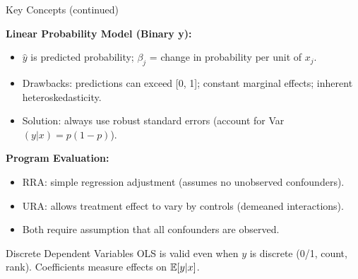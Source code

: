 \documentclass[aspectratio=169, 12pt]{beamer}
\begin{document}
\begin{frame}[shrink=20]{Key Concepts (continued)}

  \begin{highlightbox}
    \textbf{Linear Probability Model (Binary y):}
    \begin{itemize}
      \item $\hat{y}$ is predicted probability; $\beta_j$ = change in probability per unit of $x_j$.
      \item Drawbacks: predictions can exceed [0, 1]; constant marginal effects; inherent heteroskedasticity.
      \item Solution: always use robust standard errors (account for Var$(y|x) = p(1-p)$).
    \end{itemize}
  \end{highlightbox}

  \medskip

  \begin{keybox}
    \textbf{Program Evaluation:}
    \begin{itemize}
      \item RRA: simple regression adjustment (assumes no unobserved confounders).
      \item URA: allows treatment effect to vary by controls (demeaned interactions).
      \item Both require assumption that all confounders are observed.
    \end{itemize}
  \end{keybox}

  \medskip

  \begin{examplebox}{Discrete Dependent Variables}
    OLS is valid even when $y$ is discrete (0/1, count, rank). Coefficients measure effects on $\operatorname{\mathbb{E}}[y | x]$.
  \end{examplebox}

\end{frame}
\end{document}
